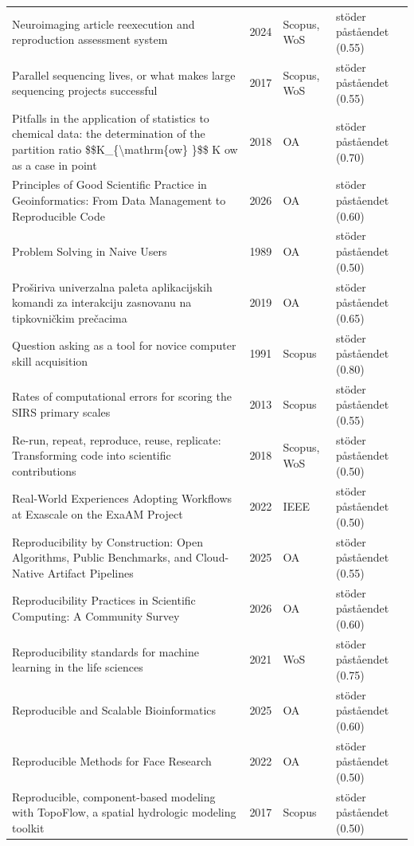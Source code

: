 \begin{longtable}{@{}%
  >{\raggedright\arraybackslash}p{}c%
  >{\raggedright\arraybackslash}p{}%
  >{\raggedright\arraybackslash}p{}@{}}
Neuroimaging article reexecution and reproduction assessment system & 2024 & Scopus, WoS & stöder påståendet (0.55) \\
Parallel sequencing lives, or what makes large sequencing projects successful & 2017 & Scopus, WoS & stöder påståendet (0.55) \\
Pitfalls in the application of statistics to chemical data: the determination of the partition ratio \$\$K\_\{\textbackslash{}mathrm\{ow\} \}\$\$ K ow as a case in point & 2018 & OA & stöder påståendet (0.70) \\
Principles of Good Scientific Practice in Geoinformatics: From Data Management to Reproducible Code & 2026 & OA & stöder påståendet (0.60) \\
Problem Solving in Naive Users & 1989 & OA & stöder påståendet (0.50) \\
Proširiva univerzalna paleta aplikacijskih komandi za interakciju zasnovanu na tipkovničkim prečacima & 2019 & OA & stöder påståendet (0.65) \\
Question asking as a tool for novice computer skill acquisition & 1991 & Scopus & stöder påståendet (0.80) \\
Rates of computational errors for scoring the SIRS primary scales & 2013 & Scopus & stöder påståendet (0.55) \\
Re-run, repeat, reproduce, reuse, replicate: Transforming code into scientific contributions & 2018 & Scopus, WoS & stöder påståendet (0.50) \\
Real-World Experiences Adopting Workflows at Exascale on the ExaAM Project & 2022 & IEEE & stöder påståendet (0.50) \\
Reproducibility by Construction: Open Algorithms, Public Benchmarks, and Cloud-Native Artifact Pipelines & 2025 & OA & stöder påståendet (0.55) \\
Reproducibility Practices in Scientific Computing: A Community Survey & 2026 & OA & stöder påståendet (0.60) \\
Reproducibility standards for machine learning in the life sciences & 2021 & WoS & stöder påståendet (0.75) \\
Reproducible and Scalable Bioinformatics & 2025 & OA & stöder påståendet (0.60) \\
Reproducible Methods for Face Research & 2022 & OA & stöder påståendet (0.50) \\
Reproducible, component-based modeling with TopoFlow, a spatial hydrologic modeling toolkit & 2017 & Scopus & stöder påståendet (0.50) \\

\end{longtable}
